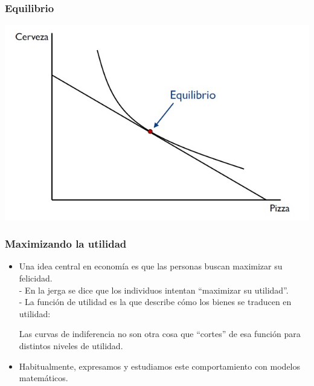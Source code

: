 \documentclass{beamer}
\begin{document}
\begin{frame}
\frametitle{Equilibrio}
\centering
\includegraphics[scale=0.65]{Slides Principios de Economia/Figures/Tema_02.19_rp17.jpg}
\end{frame}

\begin{frame}
\frametitle{Maximizando la utilidad}
\begin{itemize}
    \item Una idea central en economía es que las personas buscan maximizar su felicidad.
    \\ \vspace{2mm}
    - En la jerga se dice que los individuos intentan ``maximizar su utilidad''. \\ \vspace{2mm}
    - La función de utilidad es la que describe cómo los bienes se traducen en utilidad: \vspace{2mm}
        \begin{itemize}
        Las curvas de indiferencia no son otra cosa que ``cortes'' de esa función para distintos niveles de utilidad.
        \end{itemize}
    \item Habitualmente, expresamos y estudiamos este comportamiento con modelos matemáticos.
\end{itemize} 
\end{frame}
\end{document}
